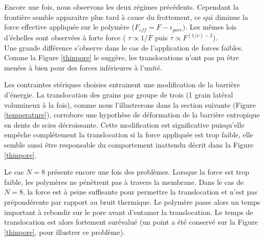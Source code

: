 \documentclass[a4paper,11pt]{article}
\begin{document}
Encore une fois, nous observons les deux régimes précédents. Cependant la frontière semble apparaitre plus tard à cause du frottement, ce qui diminue la force effective appliquée sur le polymère ($F_{eff}=F-\epsilon _{pore})$. Les mêmes lois d'échelles sont observées à forte force ( $\tau \propto 1/F$ puis $\tau \propto F^{(1/\nu) -2}$).\\

 Une grande différence s'observe dans le cas de l'application de forces faibles. Comme la Figure \ref{thinpore} le suggère, les translocations n'ont pas pu être menées à bien pour des forces inférieures à l'unité.

Les contraintes stériques choisies entrainent une modification de la barrière d'énergie. La translocation des grains par groupe de trois (1 grain latéral volumineux à la fois), comme nous l'illustrerons dans la section suivante (Figure \ref{temperature}), corrobore une hypothèse de déformation de la barrière entropique en dents de scies décroissante. Cette modification est significative puisqu'elle empêche complétement la translocation si la force appliquée est trop faible, elle semble aussi être responsable du comportement inattendu décrit dans la Figure \ref{thinpore}.

Le cas $N=8$ présente encore une fois des problèmes. Lorsque la force est trop faible, les polymères ne pénètrent pas à travers la membrane. Dans le cas de $N=8$, la force est à peine suffisante pour permettre la translocation et n'est pas prépondérente par rapport au bruit thermique. Le polymère passe alors un temps important à rebondir sur le pore avant d'entamer la translocation. Le temps de translocation est alors fortement surévalué (un point a été conservé sur la Figure \ref{thinpore}, pour illustrer ce problème).
\end{document}
